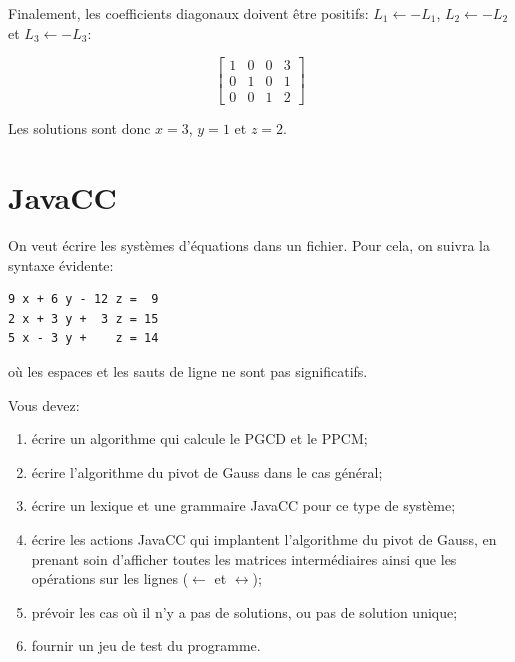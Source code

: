 \documentclass[11pt,a4paper]{article}
\begin{document}
Finalement, les coefficients diagonaux doivent être positifs: $L_1
\leftarrow -L_1$, $L_2 \leftarrow -L_2$ et $L_3 \leftarrow -L_3$:

\[
\left[
\begin{array}{rrr|r}
1 &  0 &  0 & 3\\
0 & 1 &  0 & 1\\
0 &  0 & 1 & 2
\end{array}
\right]
\]

Les solutions sont donc $x = 3$, $y = 1$ et $z = 2$.

\section{JavaCC}

On veut écrire les systèmes d'équations dans un fichier. Pour cela, on
suivra la syntaxe évidente:

\begin{verbatim}
9 x + 6 y - 12 z =  9
2 x + 3 y +  3 z = 15
5 x - 3 y +    z = 14
\end{verbatim}

\noindent
où les espaces et les sauts de ligne ne sont pas significatifs.

\noindent
Vous devez:

\begin{enumerate}

  \item écrire un algorithme qui calcule le PGCD et le PPCM;

  \item écrire l'algorithme du pivot de Gauss dans le cas général;

  \item écrire un lexique et une grammaire \textsf{JavaCC} pour ce
        type de système;

  \item écrire les actions \textsf{JavaCC} qui implantent l'algorithme
        du pivot de Gauss, en prenant soin d'afficher toutes les
        matrices intermédiaires ainsi que les opérations sur les
        lignes ($\leftarrow$ et $\leftrightarrow$);

  \item prévoir les cas où il n'y a pas de solutions, ou pas de
        solution unique;

  \item fournir un jeu de test du programme.

\end{enumerate}
\end{document}
